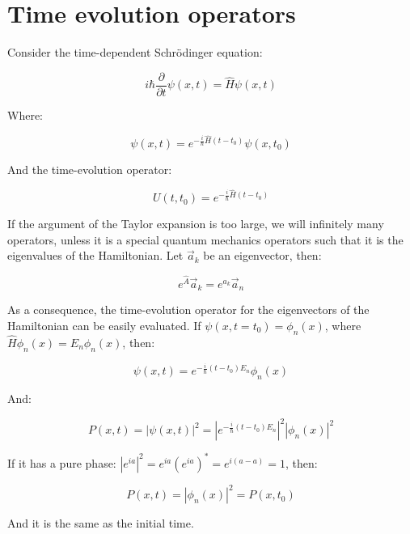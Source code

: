 \section{Time evolution operators}
Consider the time-dependent Schr\"odinger equation:

$$i\hbar\frac{\partial}{\partial t}\psi(x,t) = \hat{H}\psi(x,t)$$

Where:

$$\psi(x,t) = e^{-\frac{i}{\hbar}\hat{H}(t-t_0)}\psi(x,t_0)$$

And the time-evolution operator:

$$U(t,t_0) = e^{-\frac{i}{\hbar}\hat{H}(t-t_0)}$$

If the argument of the Taylor expansion is too large, we will infinitely many operators, unless it is a special quantum mechanics operators such that it is the eigenvalues of the Hamiltonian.
Let $\vec{a}_k$ be an eigenvector, then:

$$e^{\hat{A}}\vec{a}_k = e^{a_k}\vec{a}_n$$

As a consequence, the time-evolution operator for the eigenvectors of the Hamiltonian can be easily evaluated.
If $\psi(x,t=t_0) = \phi_n(x)$, where $\hat{H}\phi_n(x) = E_n\phi_n(x)$, then:

$$\psi(x,t) = e^{-\frac{i}{\hbar}(t-t_0)E_n}\phi_n(x)$$

And:

$$P(x,t) = |\psi(x,t)|^2 = |e^{-\frac{i}{\hbar}(t-t_0)E_n}|^2|\phi_n(x)|^2$$

If it has a pure phase: $|e^{ia}|^2 = e^{ia}(e^{ia})^* = e^{i(a-a)} = 1$, then:

$$P(x,t) = |\phi_n(x)|^2 = P(x,t_0)$$

And it is the same as the initial time.
